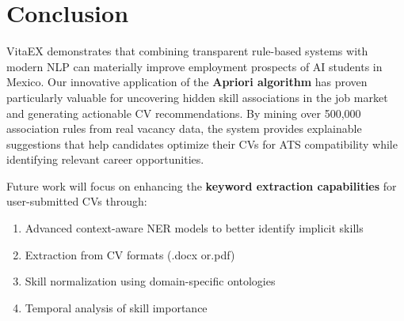 \documentclass[runningheads]{llncs}
\begin{document}
%	
%	
\section{Conclusion}
VitaEX demonstrates that combining transparent rule-based systems with modern NLP can materially improve employment prospects of AI students in Mexico. Our innovative application of the \textbf{Apriori algorithm} has proven particularly valuable for uncovering hidden skill associations in the job market and generating actionable CV recommendations. By mining over 500,000 association rules from real vacancy data, the system provides explainable suggestions that help candidates optimize their CVs for ATS compatibility while identifying relevant career opportunities.

Future work will focus on enhancing the \textbf{keyword extraction capabilities} for user-submitted CVs through:
\begin{enumerate}
	\item Advanced context-aware NER models to better identify implicit skills
	\item Extraction from CV formats (.docx or.pdf)
	\item Skill normalization using domain-specific ontologies
	\item Temporal analysis of skill importance 
\end{enumerate}
\end{document}
